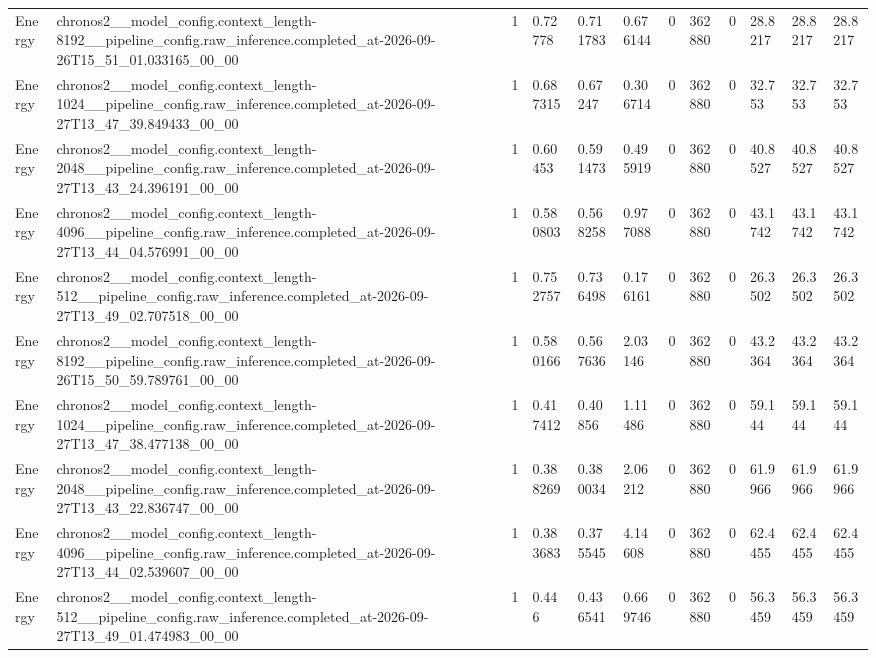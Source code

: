 \begin{tabular}{llllllllllll}
Energy & chronos2\_\_model\_config.context\_length-8192\_\_pipeline\_config.raw\_inference.completed\_at-2026-09-26T15\_51\_01.033165\_00\_00 & 1 & 0.72778 & 0.711783 & 0.676144 & 0 & 362880 & 0 & 28.8217 & 28.8217 & 28.8217 \\
Energy & chronos2\_\_model\_config.context\_length-1024\_\_pipeline\_config.raw\_inference.completed\_at-2026-09-27T13\_47\_39.849433\_00\_00 & 1 & 0.687315 & 0.67247 & 0.306714 & 0 & 362880 & 0 & 32.753 & 32.753 & 32.753 \\
Energy & chronos2\_\_model\_config.context\_length-2048\_\_pipeline\_config.raw\_inference.completed\_at-2026-09-27T13\_43\_24.396191\_00\_00 & 1 & 0.60453 & 0.591473 & 0.495919 & 0 & 362880 & 0 & 40.8527 & 40.8527 & 40.8527 \\
Energy & chronos2\_\_model\_config.context\_length-4096\_\_pipeline\_config.raw\_inference.completed\_at-2026-09-27T13\_44\_04.576991\_00\_00 & 1 & 0.580803 & 0.568258 & 0.977088 & 0 & 362880 & 0 & 43.1742 & 43.1742 & 43.1742 \\
Energy & chronos2\_\_model\_config.context\_length-512\_\_pipeline\_config.raw\_inference.completed\_at-2026-09-27T13\_49\_02.707518\_00\_00 & 1 & 0.752757 & 0.736498 & 0.176161 & 0 & 362880 & 0 & 26.3502 & 26.3502 & 26.3502 \\
Energy & chronos2\_\_model\_config.context\_length-8192\_\_pipeline\_config.raw\_inference.completed\_at-2026-09-26T15\_50\_59.789761\_00\_00 & 1 & 0.580166 & 0.567636 & 2.03146 & 0 & 362880 & 0 & 43.2364 & 43.2364 & 43.2364 \\
Energy & chronos2\_\_model\_config.context\_length-1024\_\_pipeline\_config.raw\_inference.completed\_at-2026-09-27T13\_47\_38.477138\_00\_00 & 1 & 0.417412 & 0.40856 & 1.11486 & 0 & 362880 & 0 & 59.144 & 59.144 & 59.144 \\
Energy & chronos2\_\_model\_config.context\_length-2048\_\_pipeline\_config.raw\_inference.completed\_at-2026-09-27T13\_43\_22.836747\_00\_00 & 1 & 0.388269 & 0.380034 & 2.06212 & 0 & 362880 & 0 & 61.9966 & 61.9966 & 61.9966 \\
Energy & chronos2\_\_model\_config.context\_length-4096\_\_pipeline\_config.raw\_inference.completed\_at-2026-09-27T13\_44\_02.539607\_00\_00 & 1 & 0.383683 & 0.375545 & 4.14608 & 0 & 362880 & 0 & 62.4455 & 62.4455 & 62.4455 \\
Energy & chronos2\_\_model\_config.context\_length-512\_\_pipeline\_config.raw\_inference.completed\_at-2026-09-27T13\_49\_01.474983\_00\_00 & 1 & 0.446 & 0.436541 & 0.669746 & 0 & 362880 & 0 & 56.3459 & 56.3459 & 56.3459 \\

\end{tabular}
